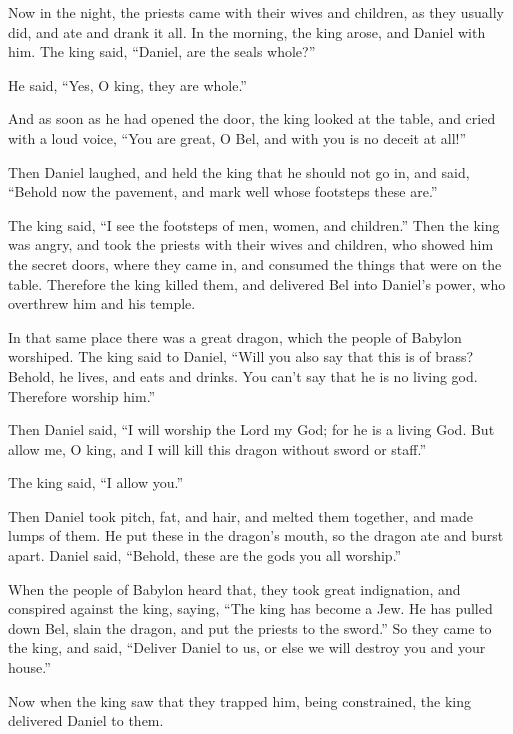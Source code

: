 {\par }{\PP {}Now in the night, the priests came with their wives and children, as they usually did, and ate and drank it all.
In the morning, the king arose, and Daniel with him.
The king said, “Daniel, are the seals whole?”
\par }{\PP He said, “Yes, O king, they are whole.”
\par }{\PP {}And as soon as he had opened the door, the king looked at the table, and cried with a loud voice, “You are great, O Bel, and with you is no deceit at all!”
\par }{\PP {}Then Daniel laughed, and held the king that he should not go in, and said, “Behold now the pavement, and mark well whose footsteps these are.”
\par }{\PP {}The king said, “I see the footsteps of men, women, and children.” Then the king was angry,
and took the priests with their wives and children, who showed him the secret doors, where they came in, and consumed the things that were on the table.
Therefore the king killed them, and delivered Bel into Daniel’s power, who overthrew him and his temple.
\par }{\PP {}In that same place there was a great dragon, which the people of Babylon worshiped.
The king said to Daniel, “Will you also say that this is of brass? Behold, he lives, and eats and drinks. You can’t say that he is no living god. Therefore worship him.”
\par }{\PP {}Then Daniel said, “I will worship the Lord my God; for he is a living God.
But allow me, O king, and I will kill this dragon without sword or staff.”
\par }{\PP The king said, “I allow you.”
\par }{\PP {}Then Daniel took pitch, fat, and hair, and melted them together, and made lumps of them. He put these in the dragon’s mouth, so the dragon ate and burst apart. Daniel said, “Behold, these are the gods you all worship.”
\par }{\PP {}When the people of Babylon heard that, they took great indignation, and conspired against the king, saying, “The king has become a Jew. He has pulled down Bel, slain the dragon, and put the priests to the sword.”
So they came to the king, and said, “Deliver Daniel to us, or else we will destroy you and your house.”
\par }{\PP {}Now when the king saw that they trapped him, being constrained, the king delivered Daniel to them.
}
